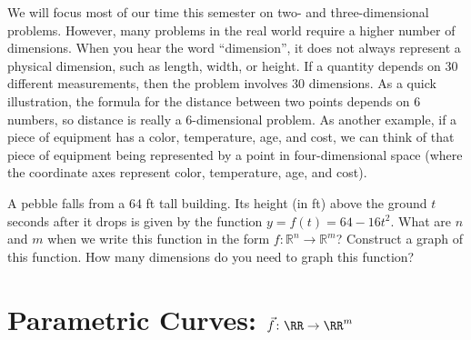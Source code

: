 We will focus most of our time this semester on two- and three-dimensional problems. However, many problems in the real world require a higher number of dimensions. When you hear the word ``dimension'', it does not always represent a physical dimension, such as length, width, or height.  If a quantity depends on 30 different measurements, then the problem involves 30 dimensions.  As a quick illustration, the formula for the distance between two points depends on 6 numbers, so distance is really a 6-dimensional problem.  As another example, if a piece of equipment has a color, temperature, age, and cost, we can think of that piece of equipment being represented by a point in four-dimensional space (where the coordinate axes represent color, temperature, age, and cost).


\begin{problem}\label{pebble problem}%
%
A pebble falls from a 64 ft tall building.  Its height (in ft) above the ground $t$ seconds after it drops is given by the function $y=f(t)=64-16t^2$. What are $n$ and $m$ when we write this function in the form  $f\colon {\mathbb{R}}^n\to {\mathbb{R}}^m$? Construct a graph of this function.  How many dimensions do you need to graph this function?
\end{problem}

\section{Parametric Curves: $\vec f\colon \RR \to \RR^m$}

